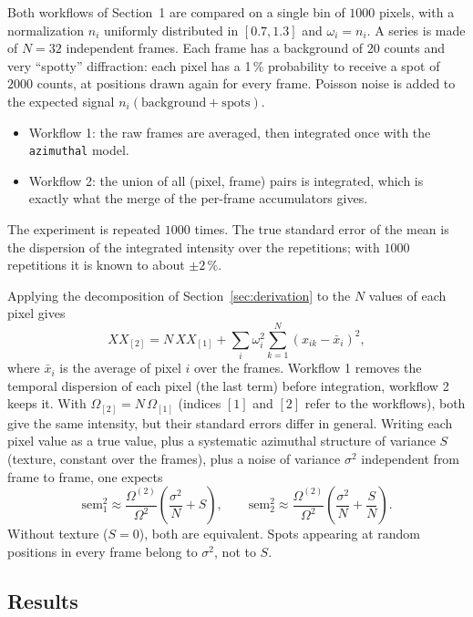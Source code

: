 \documentclass[a4paper,11pt]{article}
\newcommand{\Om}{\Omega}
\newcommand{\OmS}{\Omega^{(2)}}
\begin{document}
Both workflows of Section~1 are compared on a single bin of $1000$ pixels, with a normalization
$n_i$ uniformly distributed in $[0.7, 1.3]$ and $\omega_i = n_i$. A series is made of $N=32$ independent
frames. Each frame has a background of $20$ counts and very ``spotty'' diffraction: each pixel has a
1\,\% probability to receive a spot of $2000$ counts, at positions drawn again for every frame. Poisson
noise is added to the expected signal $n_i(\text{background}+\text{spots})$.
\begin{itemize}
\item Workflow 1: the raw frames are averaged, then integrated once with the \texttt{azimuthal} model.
\item Workflow 2: the union of all (pixel, frame) pairs is integrated, which is exactly what the merge
  of the per-frame accumulators gives.
\end{itemize}
The experiment is repeated $1000$ times. The true standard error of the mean is the dispersion of the
integrated intensity over the repetitions; with $1000$ repetitions it is known to about $\pm2\,\%$.

Applying the decomposition of Section~\ref{sec:derivation} to the $N$ values of each pixel gives
\begin{equation}
  XX_{[2]} = N\,XX_{[1]} + \sum_{i}\omega_i^2\sum_{k=1}^{N}\left(x_{ik}-\bar{x}_i\right)^2,
  \label{eq:temporal}
\end{equation}
where $\bar{x}_i$ is the average of pixel $i$ over the frames. Workflow 1 removes the temporal dispersion
of each pixel (the last term) before integration, workflow 2 keeps it. With $\Om_{[2]}=N\,\Om_{[1]}$ (indices $[1]$ and $[2]$ refer to the workflows),
both give the same intensity, but their standard errors differ in general. Writing each pixel value as
a true value, plus a systematic azimuthal structure of variance $S$ (texture, constant over the frames),
plus a noise of variance $\sigma^2$ independent from frame to frame, one expects
\begin{equation}
  \mathrm{sem}_1^2 \approx \frac{\OmS}{\Om^2}\left(\frac{\sigma^2}{N} + S\right), \qquad
  \mathrm{sem}_2^2 \approx \frac{\OmS}{\Om^2}\left(\frac{\sigma^2}{N} + \frac{S}{N}\right).
\end{equation}
Without texture ($S=0$), both are equivalent. Spots appearing at random positions in every frame belong
to $\sigma^2$, not to $S$.

\subsection{Results}
\end{document}
